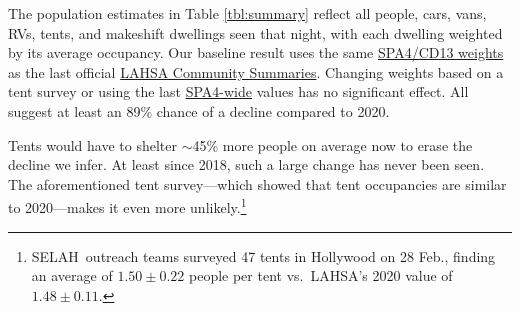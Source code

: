 \documentclass[11pt]{article}
\def\resp{respectively}
\def\selah{SELAH}
\def\nh{957\pm94}
\def\ne{556\pm83}
\begin{document}
 The population estimates in Table \ref{tbl:summary} %
reflect all people, cars, vans, RVs, tents, and makeshift dwellings seen that night, with each
dwelling weighted by its average occupancy. Our baseline result uses the same %
\href{https://www.lahsa.org/documents?id=4635-usc-2018-2020-multipliers-and-estimates-overview}
{SPA4/CD13 weights} as the last official 
\href{https://www.lahsa.org/documents?id=4686-2020-greater-los-angeles-city-community-homelessness-report-service-planning-area-4.pdf}
{LAHSA Community Summaries}. 
Changing weights based on a tent survey or using the last 
\href{https://www.lahsa.org/documents?id=4693-2020-greater-los-angeles-homeless-count-cvrtm-conversion-factors}{SPA4-wide} values has no significant effect.
All suggest at least an 89\% chance of a decline compared to 2020. 

Tents would have to shelter $\sim$45\% more people on average now to erase the decline we infer. 
At least since 2018, such a large change has never been seen. The aforementioned tent survey---which 
showed that tent occupancies are similar to 2020---makes it even more unlikely.\footnote{\selah\ 
outreach teams surveyed 47 tents in Hollywood on 28 Feb., finding an average of $1.50\pm0.22$ 
people per tent vs.~LAHSA's 2020 value of $1.48\pm0.11$.}
\end{document}
